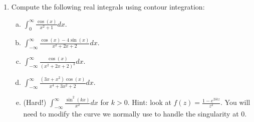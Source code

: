 \begin{enumerate}
\item Compute the following real integrals using contour integration:

\begin{enumerate}[a)]
	\item $\int_{0}^\infty \frac{\cos(x)}{x^2+1}dx$.
	\item $\int_{-\infty}^\infty \frac{\cos(x) - 4\sin(x)}{x^2 + 2x + 2}dx$.
	\item $\int_{-\infty}^\infty \frac{\cos(x)}{(x^2+2x+2)^3}dx$.
	\item $\int_{-\infty}^\infty \frac{(3x + x^2)\cos(x)}{x^4 + 3x^2 + 2}dx$.
	\item (Hard!) $\int_{-\infty}^\infty \frac{\sin^2(kx)}{x^2}dx$ for $k > 0$. Hint: look at $f(z) = \frac{1-e^{2ikz}}{z^2}$. You will need to modify the curve we normally use to handle the singularity at $0$. 

\end{enumerate}










\end{enumerate}